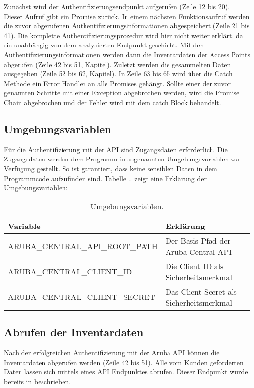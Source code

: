 Zunächst wird der Authentifizierungsendpunkt aufgerufen (Zeile 12 bis 20). Dieser Aufruf gibt ein Promise zurück. In einem nächsten Funktionsaufruf werden die zuvor abgerufenen Authentifizierungsinformationen abgespeichert (Zeile 21 bis 41). Die komplette Authentifizierungsprozedur wird hier nicht weiter erklärt, da sie unabhängig von dem analysierten Endpunkt geschieht. Mit den Authentifizierungsinformationen werden dann die Inventardaten der Access Points abgerufen (Zeile 42 bis 51, Kapitel). Zuletzt werden die gesammelten Daten ausgegeben (Zeile 52 bis 62, Kapitel). In Zeile 63 bis 65 wird über die Catch Methode ein Error Handler an alle Promises gehängt. Sollte einer der zuvor genannten Schritte mit einer Exception abgebrochen werden, wird die Promise Chain abgebrochen und der Fehler wird mit dem catch Block behandelt.

\subsection{Umgebungsvariablen}

Für die Authentifizierung mit der API sind Zugangsdaten erforderlich. Die Zugangsdaten werden dem Programm in sogenannten Umgebungsvariablen zur Verfügung gestellt. So ist garantiert, dass keine sensiblen Daten in dem Programmcode aufzufinden sind. Tabelle .. zeigt eine Erklärung der Umgebungsvariablen:


\begin{table}[htb]
\centering
\begin{tabular}{l|l}
    \textbf{Variable} & \textbf{Erklärung} \\
    \hline
    ARUBA\_CENTRAL\_API\_ROOT\_PATH & Der Basis Pfad der Aruba Central API \\
    \hline
    ARUBA\_CENTRAL\_CLIENT\_ID & Die Client ID als Sicherheitsmerkmal \\
    \hline
    ARUBA\_CENTRAL\_CLIENT\_SECRET & Das Client Secret als Sicherheitsmerkmal \\
\end{tabular}
\caption{Umgebungsvariablen.}
\label{tab:Umgebungsvariablen}
\end{table}

\subsection{Abrufen der Inventardaten}

Nach der erfolgreichen Authentifizierung mit der Aruba API können die Inventardaten abgerufen werden (Zeile 42 bis 51). Alle vom Kunden geforderten Daten lassen sich mittels eines API Endpunktes abrufen. Dieser Endpunkt wurde bereits in beschrieben. 

